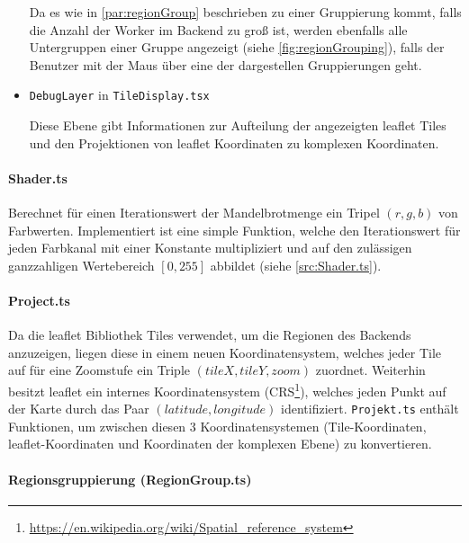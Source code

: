 \begin{itemize}
	      Da es wie in \autoref{par:regionGroup} beschrieben zu einer Gruppierung kommt, falls die Anzahl der Worker im Backend zu
	      groß ist, werden ebenfalls alle Untergruppen einer Gruppe angezeigt (siehe \autoref{fig:regionGrouping}), falls der Benutzer mit der Maus über eine der
	      dargestellen Gruppierungen geht.
	\item \verb|DebugLayer| in \verb|TileDisplay.tsx|

	      Diese Ebene gibt Informationen zur Aufteilung der angezeigten leaflet Tiles und den Projektionen von
	      leaflet Koordinaten zu komplexen Koordinaten.
\end{itemize}


\paragraph{Shader.ts}\label{par:shader}
Berechnet für einen Iterationswert der Mandelbrotmenge ein Tripel \( (r,g,b) \) von Farbwerten.
Implementiert ist eine simple Funktion, welche den Iterationswert für jeden Farbkanal mit einer Konstante multipliziert
und auf den zulässigen ganzzahligen Wertebereich \( [0,255] \) abbildet (siehe \autoref{src:Shader.ts}).

\begin{figure}[h!]
	
\end{figure}

\paragraph{Project.ts}
Da die leaflet Bibliothek Tiles verwendet, um die Regionen des Backends anzuzeigen, liegen diese in
einem neuen Koordinatensystem, welches jeder Tile auf für eine Zoomstufe ein Triple \( (tileX, tileY, zoom) \) zuordnet.
Weiterhin besitzt leaflet ein internes Koordinatensystem (CRS\footnote{\url{https://en.wikipedia.org/wiki/Spatial_reference_system}}),
welches jeden Punkt auf der Karte durch das Paar \( (latitude, longitude) \) identifiziert.
\verb|Projekt.ts| enthält Funktionen, um zwischen diesen 3 Koordinatensystemen
(Tile-Koordinaten, leaflet-Koordinaten und Koordinaten der komplexen Ebene) zu konvertieren.

\paragraph{Regionsgruppierung (RegionGroup.ts)}\label{par:regionGroup}

